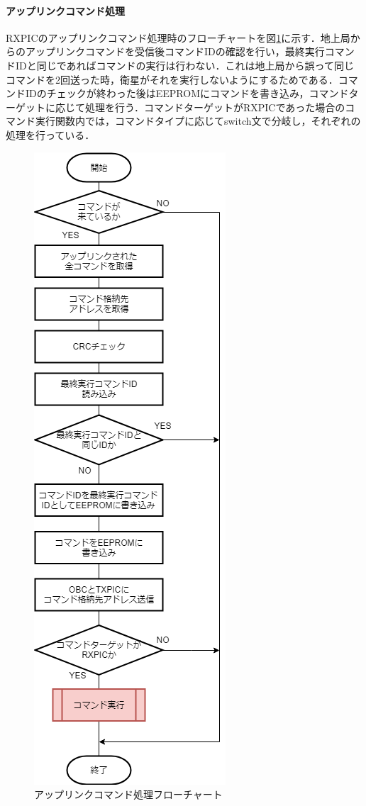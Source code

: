 \paragraph{アップリンクコマンド処理}
RXPICのアップリンクコマンド処理時のフローチャートを図\ref{fig:3-4-2-4}に示す．地上局からのアップリンクコマンドを受信後コマンドIDの確認を行い，最終実行コマンドIDと同じであればコマンドの実行は行わない．これは地上局から誤って同じコマンドを2回送った時，衛星がそれを実行しないようにするためである．コマンドIDのチェックが終わった後はEEPROMにコマンドを書き込み，コマンドターゲットに応じて処理を行う．コマンドターゲットがRXPICであった場合のコマンド実行関数内では，コマンドタイプに応じてswitch文で分岐し，それぞれの処理を行っている．
\begin{figure}[H]
	\centering
	\includegraphics[scale=0.6]{03/fig/3-4-2-4.png}
	\caption{アップリンクコマンド処理フローチャート}
	\label{fig:3-4-2-4}
\end{figure}

